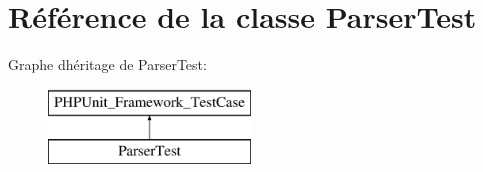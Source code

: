 \hypertarget{class_symfony_1_1_component_1_1_yaml_1_1_tests_1_1_parser_test}{}\section{Référence de la classe Parser\+Test}
\label{class_symfony_1_1_component_1_1_yaml_1_1_tests_1_1_parser_test}
Graphe d\textquotesingle{}héritage de Parser\+Test\+:\begin{figure}[H]
\begin{center}
\leavevmode
\includegraphics[height=2.000000cm]{class_symfony_1_1_component_1_1_yaml_1_1_tests_1_1_parser_test}
\end{center}
\end{figure}
